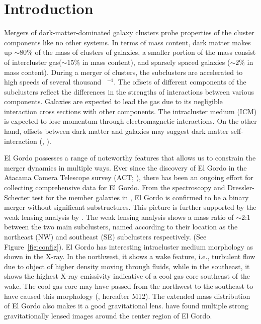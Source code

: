 \section{Introduction} 
Mergers of dark-matter-dominated galaxy clusters probe properties
of the cluster components like no other systems. 
In terms of mass content, dark matter makes up $\sim80\%$ of the mass of clusters
of galaxies, a smaller portion of the mass consist of intercluster
gas($\sim15\%$ in mass content), and sparsely spaced galaxies ($\sim2\%$ in mass content). During a merger of
clusters, the subclusters are accelerated to high speeds of several
thousand \kilo \meter~\second$^{-1}$. The offsets of
different components of the subclusters reflect the differences in the
strengths of interactions between various components. Galaxies are
expected to lead the gas due to its negligible interaction cross
sections with other components. The intracluster medium (ICM) is expected to lose
momentum through electromagnetic interactions. On the other hand, offsets
between dark matter and galaxies may suggest dark matter self-interaction
(\citealt{Kahlhoefer14}, \citealt{Randall2008d}).  
\par
El Gordo possesses a range of noteworthy features that allows us to constrain
the merger dynamics in multiple ways.  Ever since the discovery of El Gordo
in the Atacama Camera Telescope survey (ACT; \citealt{Marriage11}), there
has been an ongoing effort for
collecting comprehensive data for El Gordo.
From the spectroscopy and Dressler-Schecter test for the member galaxies
in \cite{Sifon13}, El Gordo is confirmed to be a binary merger 
without significant substructures. This picture is further supported by the
weak lensing analysis by \cite{Jee13}. The weak lensing analysis shows
a mass ratio of $\sim$2:1  between the two main subclusters, named according to their location as the northeast (NW) and southeast (SE) subclusters respectively. 
(See Figure~\ref{fig:config}). El Gordo has interesting intracluster medium morphology as shown in the X-ray. In the northwest, it shows a wake feature, i.e.,
turbulent flow due to object of higher density moving through fluids, while in the southeast, it shows
the highest X-ray emissivity indicative of a cool gas core southeast of the
wake. The cool gas core may have passed from the northwest to the southeast
to have caused this morphology (\citealt{M12}, hereafter M12). 
The extended mass distribution of El Gordo also makes it a good
gravitational lens. \cite{Zitrin13} have found multiple strong
gravitationally lensed images around the center region of El Gordo. 
